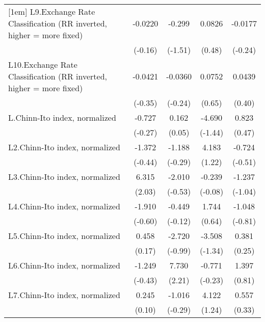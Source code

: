 {\begin{longtable}{l*{4}{c}}
[1em]
L9.Exchange Rate Classification (RR inverted, higher = more fixed)&  -0.0220         &   -0.299         &   0.0826         &  -0.0177         \\
                &  (-0.16)         &  (-1.51)         &   (0.48)         &  (-0.24)         \\
[1em]
L10.Exchange Rate Classification (RR inverted, higher = more fixed)&  -0.0421         &  -0.0360         &   0.0752         &   0.0439         \\
                &  (-0.35)         &  (-0.24)         &   (0.65)         &   (0.40)         \\
[1em]
L.Chinn-Ito index, normalized&   -0.727         &    0.162         &   -4.690         &    0.823         \\
                &  (-0.27)         &   (0.05)         &  (-1.44)         &   (0.47)         \\
[1em]
L2.Chinn-Ito index, normalized&   -1.372         &   -1.188         &    4.183         &   -0.724         \\
                &  (-0.44)         &  (-0.29)         &   (1.22)         &  (-0.51)         \\
[1em]
L3.Chinn-Ito index, normalized&    6.315\sym{*}  &   -2.010         &   -0.239         &   -1.237         \\
                &   (2.03)         &  (-0.53)         &  (-0.08)         &  (-1.04)         \\
[1em]
L4.Chinn-Ito index, normalized&   -1.910         &   -0.449         &    1.744         &   -1.048         \\
                &  (-0.60)         &  (-0.12)         &   (0.64)         &  (-0.81)         \\
[1em]
L5.Chinn-Ito index, normalized&    0.458         &   -2.720         &   -3.508         &    0.381         \\
                &   (0.17)         &  (-0.99)         &  (-1.34)         &   (0.25)         \\
[1em]
L6.Chinn-Ito index, normalized&   -1.249         &    7.730\sym{*}  &   -0.771         &    1.397         \\
                &  (-0.43)         &   (2.21)         &  (-0.23)         &   (0.81)         \\
[1em]
L7.Chinn-Ito index, normalized&    0.245         &   -1.016         &    4.122         &    0.557         \\
                &   (0.10)         &  (-0.29)         &   (1.24)         &   (0.33)         \\

\end{longtable}}
